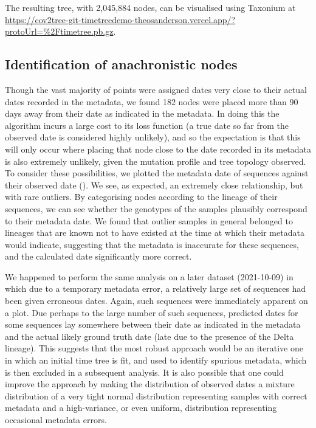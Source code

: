 The resulting tree, with 2,045,884 nodes, can be visualised using Taxonium at \url{https://cov2tree-git-timetreedemo-theosanderson.vercel.app/?protoUrl=\%2Ftimetree.pb.gz}.


\subsection*{Identification of anachronistic nodes}

Though the vast majority of points were assigned dates very close to their actual dates recorded in the metadata, we found 182 nodes were placed more than 90 days away from their date as indicated in the metadata. In doing this the algorithm incurs a large cost to its loss function (a true date so far from the observed date is considered highly unlikely), and so the expectation is that this will only occur where placing that node close to the date recorded in its metadata is also extremely unlikely, given the mutation profile and tree topology observed. To consider these possibilities, we plotted the metadata date of sequences against their observed date (). We see, as expected, an extremely close relationship, but with rare outliers. By categorising nodes according to the lineage of their sequences, we can see whether the genotypes of the samples plausibly correspond to their metadata date. We found that outlier samples in general belonged to lineages that are known not to have existed at the time at which their metadata would indicate, suggesting that the metadata is inaccurate for these sequences, and the calculated date significantly more correct. 

We happened to perform the same analysis on a later dataset (2021-10-09) in which due to a temporary metadata error, a relatively large set of sequences had been given erroneous dates. Again, such sequences were immediately apparent on a plot. Due perhaps to the large number of such sequences, predicted dates for some sequences lay somewhere between their date as indicated in the metadata and the actual likely ground truth date (late due to the presence of the Delta lineage). This suggests that the most robust approach would be an iterative one in which an initial time tree is fit, and used to identify  spurious metadata, which is then excluded in a subsequent analysis. It is also possible that one could improve the approach by making the distribution of observed dates a mixture distribution of a very tight normal distribution representing samples with correct metadata and a high-variance, or even uniform, distribution representing occasional metadata errors.

